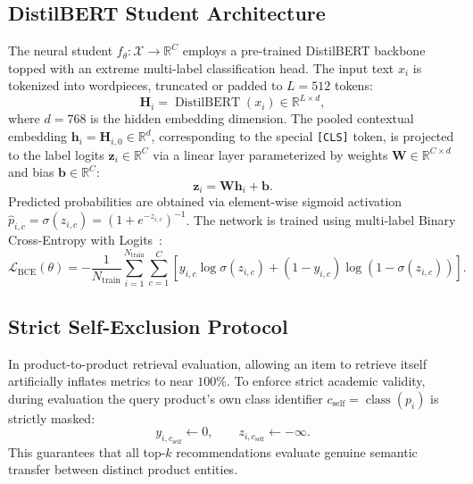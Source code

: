 \documentclass[11pt]{article}
\begin{document}
\subsection{DistilBERT Student Architecture}
The neural student $f_\theta: \mathcal{X} \to \mathbb{R}^C$ employs a pre-trained DistilBERT backbone topped with an extreme multi-label classification head. The input text $x_i$ is tokenized into wordpieces, truncated or padded to $L = 512$ tokens:
\begin{equation}
  \mathbf{H}_i = \operatorname{DistilBERT}\left(x_i\right) \in \mathbb{R}^{L \times d},
\end{equation}
where $d = 768$ is the hidden embedding dimension. The pooled contextual embedding $\mathbf{h}_i = \mathbf{H}_{i,0} \in \mathbb{R}^d$, corresponding to the special \texttt{[CLS]} token, is projected to the label logits $\mathbf{z}_i \in \mathbb{R}^C$ via a linear layer parameterized by weights $\mathbf{W} \in \mathbb{R}^{C \times d}$ and bias $\mathbf{b} \in \mathbb{R}^C$:
\begin{equation}
  \mathbf{z}_i = \mathbf{W} \mathbf{h}_i + \mathbf{b}.
\end{equation}
Predicted probabilities are obtained via element-wise sigmoid activation $\hat{p}_{i,c} = \sigma(z_{i,c}) = (1 + e^{-z_{i,c}})^{-1}$. The network is trained using multi-label Binary Cross-Entropy with Logits~\cite{nam2014}:
\begin{equation}\label{eq:bce}
  \mathcal{L}_{\text{BCE}}(\theta) = -\frac{1}{N_{\text{train}}} \sum_{i=1}^{N_{\text{train}}} \sum_{c=1}^C \left[ y_{i,c} \log \sigma(z_{i,c}) + (1 - y_{i,c}) \log \left(1 - \sigma(z_{i,c})\right) \right].
\end{equation}

\subsection{Strict Self-Exclusion Protocol}
In product-to-product retrieval evaluation, allowing an item to retrieve itself artificially inflates metrics to near $100\%$. To enforce strict academic validity, during evaluation the query product's own class identifier $c_{\text{self}} = \operatorname{class}(p_i)$ is strictly masked:
\begin{equation}
  y_{i, c_{\text{self}}} \leftarrow 0, \qquad z_{i, c_{\text{self}}} \leftarrow -\infty.
\end{equation}
This guarantees that all top-$k$ recommendations evaluate genuine semantic transfer between distinct product entities.
\end{document}
